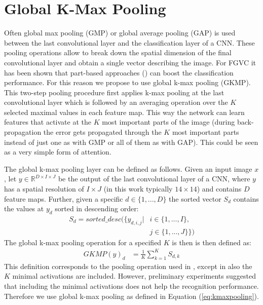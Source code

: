 \documentclass[10pt,twocolumn,letterpaper]{article}
\begin{document}
\section{Global K-Max Pooling}
\label{section:gkmp}
Often global max pooling (GMP) or global average pooling (GAP) is used between the last convolutional layer and the classification layer of a CNN. These pooling operations allow to break down the spatial dimension of the final convolutional layer and obtain a single vector describing the image. For FGVC it has been shown that part-based approaches (\eg \cite{zheng2017learning}) can boost the classification performance. For this reason we propose to use global k-max pooling (GKMP). This two-step pooling procedure first applies k-max pooling \cite{koniusz2013comparison} at the last convolutional layer which is followed by an averaging operation over the $K$ selected maximal values in each feature map. This way the network can learn features that activate at the $K$ most important parts of the image (during back-propagation the error gets propagated through the $K$ most important parts instead of just one as with GMP or all of them as with GAP).
This could be seen as a very simple form of attention.

The global k-max pooling layer can be defined as follows. Given an input image $x$, let $y \in \mathbb{R}^{D \times I \times J}$ be the output of the last convolutional layer of a CNN, where $y$ has a spatial resolution of $I \times J$ (in this work typically $14 \times 14$) and contains $D$ feature maps. Further, given a specific $d \in \{1,...,D\}$ the sorted vector $S_d$ contains the values at $y_d$ sorted in descending order:
\begin{align}
  \label{eq:sortedmax}
  S_d = sorted\_desc( \{ y_{d,i,j} | &i \in \{1,...,I\}, \nonumber \\
        &j \in \{1,...,J\} \})
\end{align}
The global k-max pooling operation for a specified $K$ is then is then defined as:
\begin{align}
  \label{eq:kmaxpooling}
  GKMP(y)_d &= \frac{1}{K} \sum_{k=1}^K S_{d,k}
\end{align}
This definition corresponds to the pooling operation used in \cite{durand2016weldon}, except in \cite{durand2016weldon} also the $K$ minimal activations are included. However, preliminary experiments suggested that including the minimal activations does not help the recognition performance. Therefore we use global k-max pooling as defined in Equation (\ref{eq:kmaxpooling}).
\end{document}
